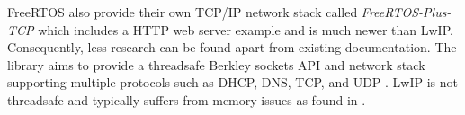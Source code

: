 FreeRTOS also provide their own TCP/IP network stack called \textit{FreeRTOS-Plus-TCP} which includes a HTTP web server example and is much newer than LwIP.
Consequently, less research can be found apart from existing documentation. The library aims to provide a threadsafe Berkley sockets API and network stack 
supporting multiple protocols such as DHCP, DNS, TCP, and UDP \cite{FreeRTOSTCP}. LwIP is not threadsafe and typically suffers from memory issues as found 
in \cite{OptimCortexLwIP}.


